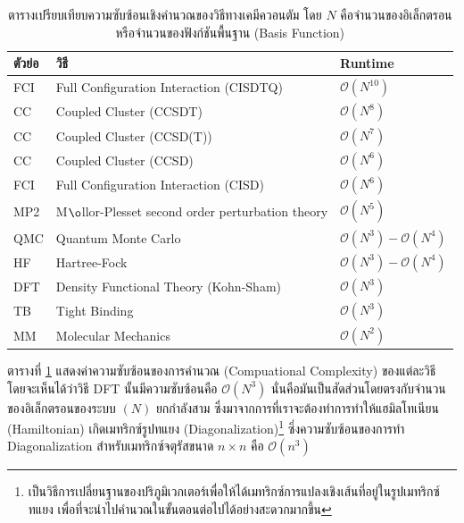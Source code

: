 \begin{table}[H]
    \centering
    \caption{ตารางเปรียบเทียบความซับซ้อนเชิงคำนวณของวิธีทางเคมีควอนตัม\autocite{rupp2015} โดย $N$ คือจำนวนของอิเล็กตรอนหรือจำนวนของฟังก์ชันพื้นฐาน (Basis Function)}
    \label{tab:qm_complx}
    \small
    \begin{tabular}{lll}\toprule
    \textbf{ตัวย่อ} &\textbf{วิธี} &\textbf{Runtime} \\\midrule
    FCI &Full Configuration Interaction (CISDTQ) &$\mathcal{O}(N^{10})$ \\
    CC &Coupled Cluster (CCSDT) &$\mathcal{O}(N^{8})$ \\
    CC &Coupled Cluster (CCSD(T)) &$\mathcal{O}(N^{7})$ \\
    CC &Coupled Cluster (CCSD) &$\mathcal{O}(N^{6})$ \\
    FCI &Full Configuration Interaction (CISD) &$\mathcal{O}(N^{6})$ \\
    MP2 &M$\o$llor-Plesset second order perturbation theory &$\mathcal{O}(N^{5})$ \\
    QMC &Quantum Monte Carlo &$\mathcal{O}(N^{3}) - \mathcal{O}(N^{4})$ \\
    HF &Hartree-Fock &$\mathcal{O}(N^{3}) - \mathcal{O}(N^{4})$ \\
    DFT &Density Functional Theory (Kohn-Sham) &$\mathcal{O}(N^{3})$ \\
    TB &Tight Binding &$\mathcal{O}(N^{3})$ \\
    MM &Molecular Mechanics &$\mathcal{O}(N^{2})$ \\
    \bottomrule
    \end{tabular}
\end{table}

ตารางที่ \ref{tab:qm_complx} แสดงค่าความซับซ้อนของการคำนวณ (Compuational Complexity) ของแต่ละวิธี โดยจะเห็นได้ว่าวิธี DFT นั้นมีความซับซ้อนคือ $\mathcal{O}(N^{3})$ นั่นคือมันเป็นสัดส่วนโดยตรงกับจำนวนของอิเล็กตรอนของระบบ $(N)$ ยกกำลังสาม ซึ่งมาจากการที่เราจะต้องทำการทำให้แฮมิลโทเนียน (Hamiltonian) เกิดเมทริกซ์รูปทแยง (Diagonalization)\footnote{เป็นวิธีการเปลี่ยนฐานของปริภูมิเวกเตอร์เพื่อให้ได้เมทริกซ์การแปลงเชิงเส้นที่อยู่ในรูปเมทริกซ์ทแยง เพื่อที่จะนำไปคำนวณในขั้นตอนต่อไปได้อย่างสะดวกมากขึ้น} ซึ่งความซับซ้อนของการทำ Diagonalization สำหรับเมทริกซ์จตุรัสขนาด $n \times n$ คือ $\mathcal{O}(n^{3})$

